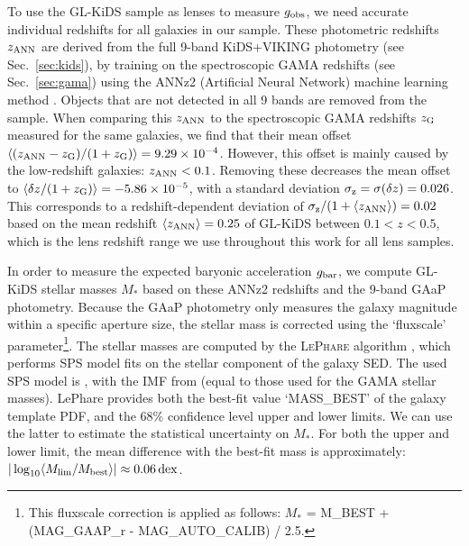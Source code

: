 \documentclass[usenatbib]{mnras}
\newcommand{\lan}{\langle}
\newcommand{\ran}{\rangle}
\newcommand*{\meanb}[1]{\langle{#1}\rangle}
\newcommand*{\E}[1]{\times 10^{#1}}
\newcommand{\un}[1]{_{\rm #1}}
\newcommand{\dex}{\, {\rm dex}}
\begin{document}
To use the GL-KiDS sample as lenses to measure $g\un{obs}$, we need accurate individual redshifts for all galaxies in our sample. These photometric redshifts $z\un{ANN}$ are derived from the full 9-band KiDS+VIKING photometry (see Sec.~\ref{sec:kids}), by training on the spectroscopic GAMA redshifts (see Sec.~\ref{sec:gama}) using the ANNz2 (Artificial Neural Network) machine learning method \cite[]{sadeh2016,dejong2017,bilicki2017}. Objects that are not detected in all 9 bands are removed from the sample. When comparing this $z\un{ANN}$ to the spectroscopic GAMA redshifts $z\un{G}$ measured for the same galaxies, we find that their mean offset $\meanb{(z\un{ANN} - z\un{G})/(1+z\un{G})} = 9.29\E{-4}$. However, this offset is mainly caused by the low-redshift galaxies: $z\un{ANN}<0.1$. Removing these decreases the mean offset to $\meanb{\delta z/(1+z\un{G})} = -5.86\E{-5}$, with a standard deviation $\sigma\un{z} = \sigma(\delta z) = 0.026$. This corresponds to a redshift-dependent deviation of $\sigma\un{z}/(1+\meanb{z\un{ANN}})=0.02$ based on the mean redshift $\meanb{z\un{ANN}} = 0.25$ of GL-KiDS between $0.1<z<0.5$, which is the lens redshift range we use throughout this work for all lens samples.

In order to measure the expected baryonic acceleration $g\un{bar}$, we compute GL-KiDS stellar masses $M_*$ based on these ANNz2 redshifts and the 9-band GAaP photometry. Because the GAaP photometry only measures the galaxy magnitude within a specific aperture size, the stellar mass is corrected using the `fluxscale' parameter\footnote{This fluxscale correction is applied as follows: $M_*$ = M\_BEST + (MAG\_GAAP\_r - MAG\_AUTO\_CALIB) / 2.5.}. The stellar masses are computed by the \textsc{LePhare} algorithm \cite[]{arnouts1999, ilbert2006}, which performs SPS model fits on the stellar component of the galaxy SED. The used SPS model is \cite{bruzual2003}, with the IMF from \cite{chabrier2003} (equal to those used for the GAMA stellar masses). LePhare provides both the best-fit value `MASS\_BEST' of the galaxy template PDF, and the $68\%$ confidence level upper and lower limits. We can use the latter to estimate the statistical uncertainty on $M_*$. For both the upper and lower limit, the mean difference with the best-fit mass is approximately: $|\log_{10}\lan M\un{lim}/M\un{best} \ran| \approx 0.06 \dex$.
\end{document}
